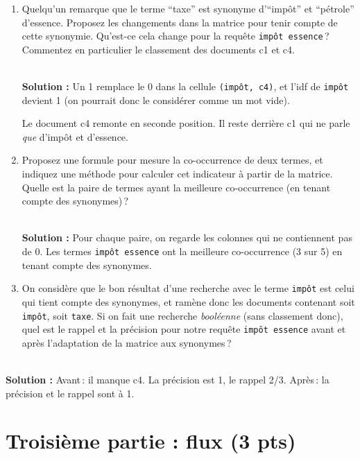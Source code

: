 \documentclass[11pt,a4paper]{article}
\newenvironment{solution}[0]{
~\\ \color{red} \textbf{Solution : }\color{black}}{%
}
\begin{document}
\begin{enumerate}
\begin{solution}
\end{solution}  

   \item Quelqu'un remarque que le terme ``taxe'' est synonyme d'``impôt'' et ``pétrole'' d'essence.
      Proposez les changements dans la matrice pour tenir compte de cette synonymie. Qu'est-ce cela
         change pour la requête \texttt{impôt essence}\,? Commentez en particulier
         le classement des documents c1 et c4.
   
\begin{solution}
Un 1 remplace le 0 dans la cellule \texttt{(impôt, c4)}, et l'idf de \texttt{impôt} devient 1 (on pourrait
donc le considérer comme un mot vide).

Le document c4 remonte en seconde position. Il reste derrière c1 qui ne parle \emph{que} d'impôt et d'essence.
\end{solution}   
    
\item Proposez une formule pour mesure la co-occurrence de deux termes, et
     indiquez une méthode pour calculer cet indicateur à partir de la matrice. Quelle
     est la paire de termes ayant la meilleure co-occurrence (en tenant compte des synonymes)\,?


\begin{solution}
Pour chaque paire, on regarde les colonnes qui ne contiennent pas de 0. Les termes \texttt{impôt essence}
ont la meilleure co-occurrence (3 sur 5) en tenant compte des synonymes.
\end{solution}   
    
     \item On considère que le bon résultat d'une recherche avec le terme \texttt{impôt}
             est celui qui tient compte des synonymes, et ramène donc les documents
                contenant soit \texttt{impôt}, soit  \texttt{taxe}. Si on fait une recherche \emph{booléenne}
                (sans classement donc), quel est le rappel
                et la précision pour notre requête \texttt{impôt essence} avant et après l'adaptation de la matrice aux synonymes\,?
\end{enumerate}


\begin{solution}
Avant\,: il manque c4. La précision est 1, le rappel 2/3. Après\,: la précision et le rappel sont à 1. 
\end{solution}   
    
    
\section*{Troisième partie : flux (3 pts)}
\end{document}

